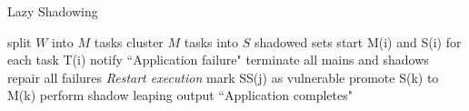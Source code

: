 \begin{algorithm}[t]
  \caption{Lazy Shadowing}
  \BlankLine
  split $W$ into $M$ tasks\;  
  cluster $M$ tasks into $S$ shadowed sets\;  
  start M(i) and S(i) for each task T(i)\;
    {
        {
            {
                notify ``Application failure"\;
                terminate all mains and shadows\;
                repair all failures\;
                \emph{Restart execution}\; %
            }
            {
                mark SS(j) as vulnerable\;
                {
                    promote S(k) to M(k)\;
                    perform shadow leaping\; %
                }
            }
        }  
    }
    output ``Application completes"\;
  \label{al:ls}
\end{algorithm}

